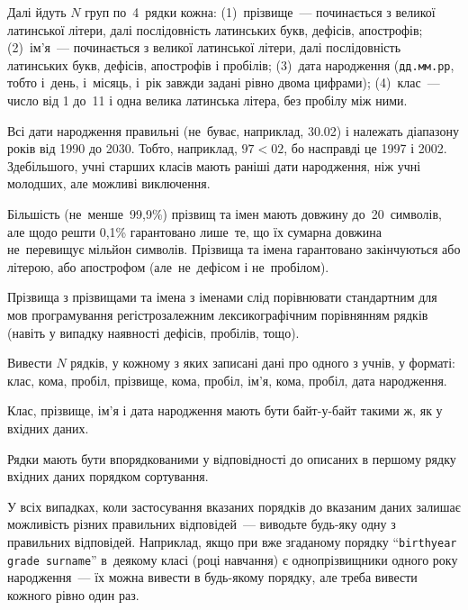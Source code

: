 Далі йдуть $N$ груп по~4~рядки кожна: 
(1)~прізвище~--- починається з великої латинської літери, далі послідовність латинських букв, дефісів, апострофів;
(2)~ім'я~--- починається з великої латинської літери, далі послідовність латинських букв, дефісів, апострофів і пробілів;
(3)~дата народження ({\tt дд.мм.рр}, тобто і~день, і~місяць, і~рік завжди задані рівно двома цифрами); 
(4)~клас~--- число від 1 до~11 і одна велика латинська літера, без пробілу між ними.

Всі дати народження правильні (не~буває, наприклад, 30.02) і належать діапазону років від 1990 до 2030. 
Тобто, наприклад, $97<02$, бо насправді це 1997 і 2002. Здебільшого, учні старших класів мають раніші дати народження, ніж учні молодших, але можливі виключення.

Більшість (не~менше~99,9\%) прізвищ та імен мають довжину до~20~символів, але щодо решти 0,1\% гарантовано лише~те, 
що їх сумарна довжина не~перевищує мільйон символів. Прізвища та імена гарантовано закінчуються або літерою, або апострофом 
(але~не~дефісом і не~пробілом).

Прізвища з прізвищами та імена з іменами слід порівнювати стандартним для мов програмування регістрозалежним лексикографічним порівнянням рядків (навіть у випадку наявності дефісів, пробілів, тощо). 


\OutputFile

Вивести $N$ рядків, у кожному з яких записані дані про одного з учнів, у форматі:
клас, кома, пробіл, прізвище, кома, пробіл, ім'я, кома, пробіл, дата народження.

Клас, прізвище, ім'я і дата народження мають бути байт-у-байт такими ж, як у вхідних даних.

Рядки мають бути впорядкованими у відповідності до описаних в першому рядку вхідних даних порядком сортування. 

У всіх випадках, коли застосування вказаних порядків до вказаним даних залишає можливість різних правильних відповідей~---
виводьте будь-яку одну з правильних відповідей. Наприклад, якщо при вже згаданому порядку ``{\tt birthyear grade surname}'' в~деякому класі (році навчання) є однопрізвищники одного року народження~--- їх можна вивести в будь-якому порядку, але треба вивести кожного рівно один раз.  

\Examples

\begin{examplewide}
%
\end{examplewide}



